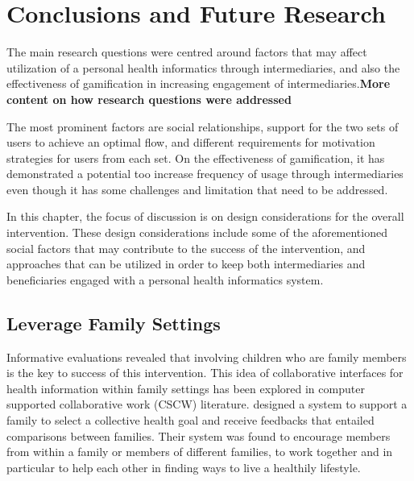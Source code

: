 
\chapter{Conclusions and Future Research} %

\label{discussionchapter} %


The main research questions were centred around factors that may affect utilization of a personal health informatics through intermediaries, and also the effectiveness of gamification in increasing engagement of intermediaries.{\textbf{More content on how research questions were addressed}}

 The most prominent factors are social relationships, support for the two sets of users to achieve an optimal flow, and  different requirements for motivation strategies for users from each set. On the effectiveness of gamification, it has demonstrated a potential too increase frequency of usage through intermediaries even though it has some challenges and limitation that need to be addressed.
  
In this chapter, the focus of discussion is on design considerations for the overall intervention. These design considerations include some of the aforementioned social factors that may contribute to the success of the intervention, and approaches that can be utilized in order to keep both intermediaries and beneficiaries engaged with a personal health informatics system.
 
\section{Leverage Family Settings}
Informative evaluations revealed that involving children who are family members is the key to success of this intervention. This idea of collaborative interfaces for health information within family settings has been explored in computer supported collaborative work (CSCW) literature. \cite{colineau2011motivating} designed a system to support a family to select a collective health goal and receive feedbacks that entailed comparisons between families. Their system was found to encourage members from within a family or members of different families, to work together and in particular to help each other in finding ways to live a healthily lifestyle. 

